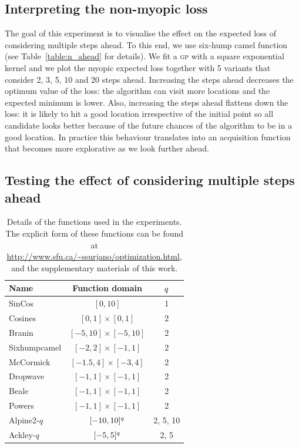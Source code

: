 \documentclass[twoside]{article}
\newcommand{\acr}[1]{\textsc{#1}\xspace}
\newcommand{\gp}{\acr{gp}}
\begin{document}
\subsection{Interpreting the non-myopic loss}
The goal of this experiment is to visualise the effect on the expected loss of considering multiple steps ahead. To this end, we use six-hump camel function (see Table~\ref{table:n_ahead} for details). We fit a \gp with a square exponential kernel and we plot the myopic expected loss together with 5 variants that consider 2, 3, 5, 10 and 20 steps ahead. Increasing the steps ahead decreases the optimum value of the loss: the algorithm can visit more locations and the expected minimum is lower. Also, increasing the steps ahead flattens down the loss: it is likely to hit a good location irrespective of the initial point so all candidate looks better because of the future chances of the algorithm to be in a good location. In practice this behaviour translates into an acquisition function that becomes more explorative as we look further ahead. 


\subsection{Testing the effect of considering multiple steps ahead}

\begin{table}[t!]
\begin{center}
\begin{tabular}{lcc}
\toprule
Name &Function domain & $q$ \\
\midrule
SinCos & $[0,10]$ & 1 \\
Cosines & $[0,1]\times[0,1]$ & 2\\
Branin &$[-5,10]\times[-5,10]$ & 2\\
Sixhumpcamel  &$[-2,2]\times[-1,1]$ & 2\\
McCormick  & $[-1.5,4]\times[-3,4]$& 2\\
Dropwave   &$[-1,1]\times[-1,1]$ & 2\\
Beale   &$[-1,1]\times[-1,1]$ & 2\\
Powers  & $[-1,1]\times[-1,1]$& 2\\ %
Alpine2-$q$  & $[-10,10]^{q}$& 2, 5, 10\\
Ackley-$q$  &$[-5,5]^{q}$ & 2, 5\\
\bottomrule
\end{tabular}\caption{Details of the functions used in the experiments. The explicit form of these functions can be found at \url{http://www.sfu.ca/~ssurjano/optimization.html}, \citep{Molga1995} and the supplementary materials of this work. }\label{table:test_functions}
\end{center}
\end{table}
\end{document}
